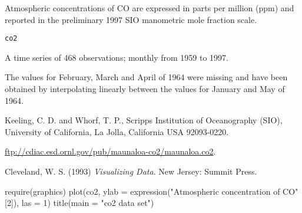 %
\begin{Examples}
\end{Examples}
%
\begin{Description}\relax
Atmospheric concentrations of CO are expressed in parts per
million (ppm) and reported in the preliminary 1997 SIO manometric mole
fraction scale.
\end{Description}
%
\begin{Usage}
\begin{verbatim}
co2
\end{verbatim}
\end{Usage}
%
\begin{Format}
A time series of 468 observations; monthly from 1959 to 1997.
\end{Format}
%
\begin{Details}\relax
The values for February, March and April of 1964 were missing and have
been obtained by interpolating linearly between the values for January
and May of 1964.
\end{Details}
%
\begin{Source}\relax
Keeling, C. D. and  Whorf, T. P.,
Scripps Institution of Oceanography (SIO),
University of California,
La Jolla, California USA 92093-0220.

\url{ftp://cdiac.esd.ornl.gov/pub/maunaloa-co2/maunaloa.co2}.
\end{Source}
%
\begin{References}\relax
Cleveland, W. S. (1993)
\emph{Visualizing Data}.
New Jersey: Summit Press.
\end{References}
%
\begin{Examples}
\begin{ExampleCode}
require(graphics)
plot(co2, ylab = expression("Atmospheric concentration of CO"[2]),
     las = 1)
title(main = "co2 data set")
\end{ExampleCode}
\end{Examples}
